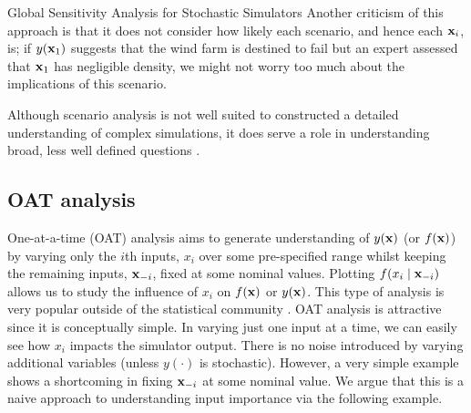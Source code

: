 \begin{chapter}{Global Sensitivity Analysis for Stochastic Simulators\label{Ch:sensitivity}}
Another criticism of this approach is that it does not consider how likely each scenario, and hence each $\mathbf{x}_i$, is; if $y(\mathbf{x}_1)$ suggests that the wind farm is destined to fail but an expert assessed that $\mathbf{x}_1$ has negligible density, we might not worry too much about the implications of this scenario.

Although scenario analysis is not well suited to constructed a detailed understanding of complex simulations, it does serve a role in understanding broad, less well defined questions \citep{Criqui2012, Samso2020}.

\subsection{OAT analysis}
One-at-a-time (OAT) analysis aims to generate understanding of $y(\mathbf{x})$ (or $f(\mathbf{x})$) by varying only the $i$th inputs, $x_i$ over some pre-specified range whilst keeping the remaining inputs, $\mathbf{x}_{-i}$, fixed at some nominal values. Plotting $f(x_i \mid \mathbf{x}_{-i})$ allows us to study the influence of $x_i$ on $f(\mathbf{x})$ or $y(\mathbf{x})$. This type of analysis is very popular outside of the statistical community \citep{Holvoet2005,Khalid2016, Saraiva2017}. OAT analysis is attractive since it is conceptually simple. In varying just one input at a time, we can easily see how $x_i$ impacts the simulator output. There is no noise introduced by varying additional variables (unless $y(\cdot)$ is stochastic). However, a very simple example shows a shortcoming in fixing $\mathbf{x}_{-i}$ at some nominal value. We argue that this is a naive approach to understanding input importance via the following example.


\end{chapter}
